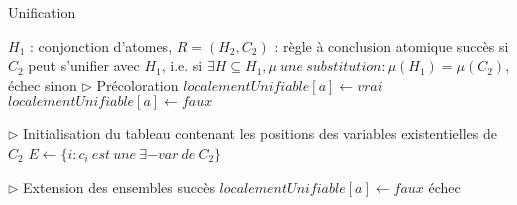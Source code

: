 \begin{center}
\begin{algorithm}[H]
\caption{Unification}\label{algo_unification}
\begin{algorithmic}[1]
\REQUIRE $H_{1}$ : conjonction d'atomes, $R = (H_{2},C_{2})$ : r\`egle \`a conclusion atomique 
\ENSURE succ\`es si $C_{2}$ peut s'unifier avec $H_{1}$, i.e. si $\exists H \subseteq H_{1}, \mu\ une\ substitution : \mu(H_{1}) = \mu(C_{2})$, \'echec sinon 
\STATE $\triangleright$ Pr\'ecoloration
		\STATE $localementUnifiable[a] \leftarrow vrai$
	\ELSE
		\STATE $localementUnifiable[a] \leftarrow faux$
	\ENDIF
\ENDFOR 

\STATE $\triangleright$ Initialisation du tableau contenant les positions des variables existentielles de $C_{2}$
\STATE $E \leftarrow \{i : c_{i}\ est\ une\ \exists-var\ de\ C_{2}\}$

\STATE $\triangleright$ Extension des ensembles
			\RETURN succ\`es
		\ENDIF
	\ENDIF
	\STATE $localementUnifiable[a] \leftarrow faux$
\ENDFOR
\RETURN \'echec
\end{algorithmic}
\end{algorithm}
\end{center}

